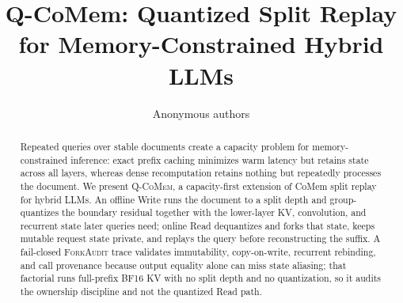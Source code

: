 \documentclass{article}
\title{Q-CoMem: Quantized Split Replay for Memory-Constrained Hybrid LLMs}
\author{Anonymous authors}
\newcommand{\qcomem}{\textsc{Q-CoMem}}
\newcommand{\method}{\textsc{ForkAudit}}
\begin{document}
\raggedbottom
\maketitle

\begin{abstract}
Repeated queries over stable documents create a capacity problem for
memory-constrained inference: exact prefix caching minimizes warm latency but
retains state across all layers, whereas dense recomputation retains nothing
but repeatedly processes the document.  We present \qcomem{}, a capacity-first
extension of CoMem split replay for hybrid LLMs.  An offline Write runs the
document to a split depth and group-quantizes the boundary residual together
with the lower-layer KV, convolution, and recurrent state later queries need;
online Read dequantizes and forks that state, keeps mutable request state
private, and replays the query before reconstructing the suffix.  A fail-closed \method{} trace validates immutability,
copy-on-write, recurrent rebinding, and call provenance because output equality
alone can miss state aliasing; that factorial runs full-prefix BF16 KV with no
split depth and no quantization, so it audits the ownership discipline and not
the quantized Read path.


\end{abstract}
\end{document}
